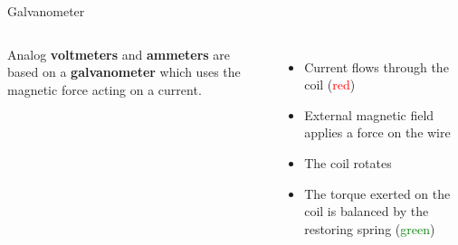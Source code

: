 \documentclass[12pt,aspectratio=169]{beamer}
\begin{document}
\begin{frame}{Galvanometer}
  \begin{columns}
    \centering

    Analog \textbf{voltmeters} and \textbf{ammeters} are based on a
    \textbf{galvanometer} which uses the magnetic force acting on a current.
    \begin{itemize}
    \item Current flows through the coil (\textcolor{red}{red})
    \item External magnetic field applies a force on the wire
    \item The coil rotates
    \item The torque exerted on the coil is balanced by the restoring spring
      (\textcolor{green}{green})
    \end{itemize}
  \end{columns}
\end{frame}
\end{document}
